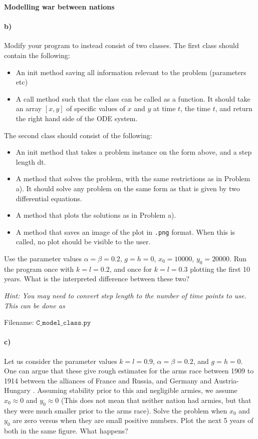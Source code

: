 \begin{Problem}{\textbf{Modelling war between nations}}
\paragraph{b)}
Modify your program to instead consist of two classes. The first class 
should contain the following:
\begin{itemize}
    \item An init method saving all information relevant to the problem (parameters etc)
    \item A call method such that the class can be called as a function. It should
    take an array $[x, y]$ of specific values of $x$ and $y$ at time $t$, the time $t$,
    and return the right hand side of the ODE system.
\end{itemize}
The second class  should consist of the following:
\begin{itemize}
    \item An init method that takes a problem instance on the form above, and a step length
    dt.
    \item A method that solves the problem, with the same restrictions as in Problem a).
            It should solve any problem on the same form as 
            that is given by two differential equations.
    \item A method that plots the solutions as in Problem a).
    \item A method that saves an image of the plot in \texttt{.png} format. When this is called,
    no plot should be visible to the user.
\end{itemize}
Use the parameter values $\alpha=\beta=0.2$, $g=h=0$, $x_0=10000$, $y_0=20000$.
Run the program once with $k=l=0.2$, and once for $k=l=0.3$ plotting the first 10 years.
What is the interpreted difference between these two?

\emph{Hint: You may need to convert step length to the number of time points to use.
This can be done as
}


Filename: $\texttt{C\_model\_class.py}$

\paragraph{c)}
Let us consider the parameter values $k=l=0.9$, $\alpha=\beta=0.2$, and $g=h=0$.
One can argue that these give rough estimates for the arms race between 1909 to 1914
between the alliances of France and Russia, and Germany and Austria-Hungary \cite{braun}.
Assuming stability prior to this and negligible armies, we assume $x_0\approx0$ and $y_0\approx0$
(This does not mean that neither nation had armies, but that they were much smaller
prior to the arms race).
Solve the problem when $x_0$ and $y_0$ are zero versus when they are small positive numbers.
Plot the next 5 years of both in the same figure. What happens?


\end{Problem}
